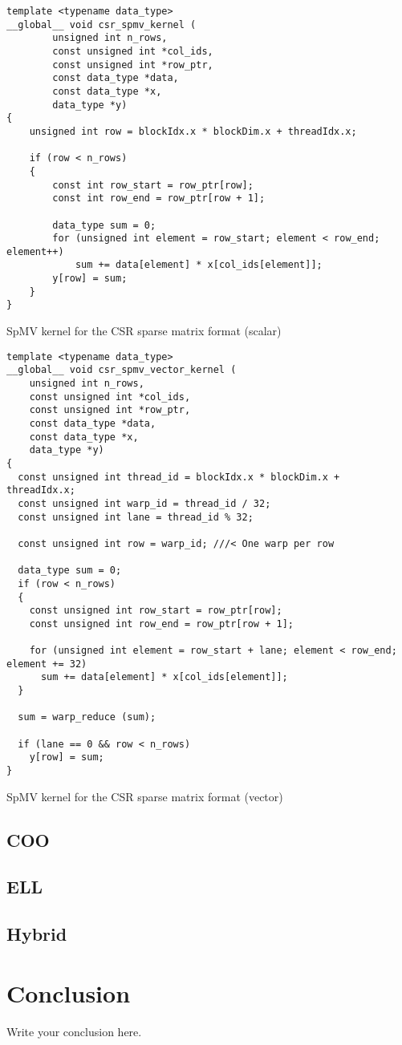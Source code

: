 \documentclass{article}
\begin{document}
\begin{listing}[H]
\begin{verbatim}
template <typename data_type>
__global__ void csr_spmv_kernel (
		unsigned int n_rows,
		const unsigned int *col_ids,
		const unsigned int *row_ptr,
		const data_type *data,
		const data_type *x,
		data_type *y)
{
	unsigned int row = blockIdx.x * blockDim.x + threadIdx.x;

	if (row < n_rows)
	{
		const int row_start = row_ptr[row];
		const int row_end = row_ptr[row + 1];

		data_type sum = 0;
		for (unsigned int element = row_start; element < row_end; element++)
			sum += data[element] * x[col_ids[element]];
		y[row] = sum;
	}
}
\end{verbatim}
\caption{SpMV kernel for the CSR sparse matrix format (scalar)}
\label{csr_scalar}
\end{listing}

\begin{listing}[H]
\begin{verbatim}
template <typename data_type>
__global__ void csr_spmv_vector_kernel (
    unsigned int n_rows,
    const unsigned int *col_ids,
    const unsigned int *row_ptr,
    const data_type *data,
    const data_type *x,
    data_type *y)
{
  const unsigned int thread_id = blockIdx.x * blockDim.x + threadIdx.x;
  const unsigned int warp_id = thread_id / 32;
  const unsigned int lane = thread_id % 32;

  const unsigned int row = warp_id; ///< One warp per row

  data_type sum = 0;
  if (row < n_rows)
  {
    const unsigned int row_start = row_ptr[row];
    const unsigned int row_end = row_ptr[row + 1];

    for (unsigned int element = row_start + lane; element < row_end; element += 32)
      sum += data[element] * x[col_ids[element]];
  }

  sum = warp_reduce (sum);

  if (lane == 0 && row < n_rows)
    y[row] = sum;
}
\end{verbatim}
\caption{SpMV kernel for the CSR sparse matrix format (vector)}
\label{csr_scalar}
\end{listing}

\subsection{COO}

\subsection{ELL}

\subsection{Hybrid}


\section{Conclusion}
Write your conclusion here.
\end{document}
